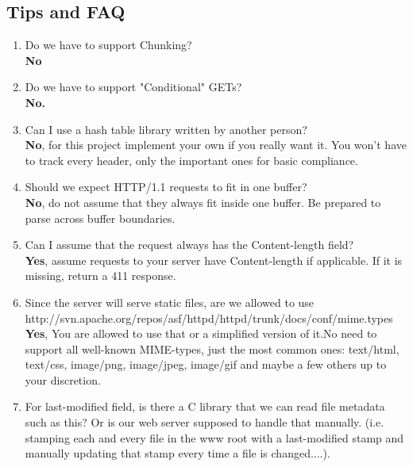 \subsection{Tips and FAQ}
\begin{enumerate}
    \item Do we have to support Chunking?\\
    \textbf{No}
    \item Do we have to support "Conditional" GETs?\\
    \textbf{No.}
    \item Can I use a hash table library written by another person?\\
    \textbf{No}, for this project implement your own if you really want it. You won't have to track every header, only the important ones for basic compliance.
    \item Should we expect HTTP/1.1 requests to fit in one buffer?\\
    \textbf{No}, do not assume that they always fit inside one buffer. Be prepared to parse across buffer boundaries.
    \item Can I assume that the request always has the Content-length field?\\
    \textbf{Yes}, assume requests to your server have Content-length if applicable. If it is missing, return a 411 response.
    \item Since the server will serve static files, are we allowed to use http://svn.apache.org/repos/asf/httpd/httpd/trunk/docs/conf/mime.types\\
    \textbf{Yes}, You are allowed to use that or a simplified version of it.No need to support all well-known MIME-types, just the most common ones: text/html, text/css, image/png, image/jpeg, image/gif and maybe a few others up to your discretion.
    \item For last-modified field, is there a C library that we can read file
     metadata  such as this? Or is our web server supposed to handle that
     manually. (i.e. stamping each and every file in the www root with a
     last-modified stamp and manually updating that stamp every time a file is
     changed....).\\

\end{enumerate}
